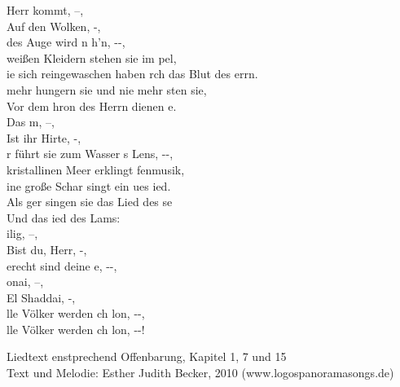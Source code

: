 
 Herr kommt, --,\\
Auf den Wolken, -,\\
des Auge wird n h'n, --,\\

 weißen Kleidern stehen sie im pel,\\
ie sich reingewaschen haben rch das Blut des errn.\\
 mehr hungern sie und nie mehr sten sie,\\
Vor dem hron des Herrn dienen e.\\

Das m, --,\\
Ist ihr Hirte, -,\\
r führt sie zum Wasser s Lens, --,\\

 kristallinen Meer erklingt fenmusik,\\
ine große Schar singt ein ues ied.\\
Als ger singen sie das Lied des se\\
Und das ied des Lams:\\

ilig, --,\\
Bist du, Herr, -,\\
erecht sind deine e, --,\\

onai, --,\\
El Shaddai, -,\\
lle Völker werden ch lon, --,\\
lle Völker werden ch lon, --!\\

\begin{footnotesize}
Liedtext enstprechend Offenbarung, Kapitel 1, 7 und 15\\
Text und Melodie: Esther Judith Becker, 2010 (www.logospanoramasongs.de)
\end{footnotesize}